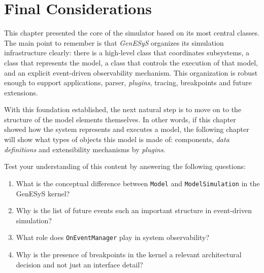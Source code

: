 \section{Final Considerations}
\label{sec:cap7_consideracoes_finais}

This chapter presented the core of the simulator based on its most central classes. The main point to remember is that \textit{GenESyS} organizes its simulation infrastructure clearly: there is a high-level class that coordinates subsystems, a class that represents the model, a class that controls the execution of that model, and an explicit event-driven observability mechanism. This organization is robust enough to support applications, parser, \textit{plugins}, tracing, breakpoints and future extensions.

With this foundation established, the next natural step is to move on to the structure of the model elements themselves. In other words, if this chapter showed how the system represents and executes a model, the following chapter will show what types of objects this model is made of: components, \textit{data definitions} and extensibility mechanisms by \textit{plugins}.

Test your understanding of this content by answering the following questions:

\begin{enumerate}
 \item What is the conceptual difference between \texttt{Model} and \texttt{ModelSimulation} in the GenESyS kernel?

\item Why is the list of future events such an important structure in event-driven simulation?

\item What role does \texttt{OnEventManager} play in system observability?

\item Why is the presence of breakpoints in the kernel a relevant architectural decision and not just an interface detail?
\end{enumerate}
